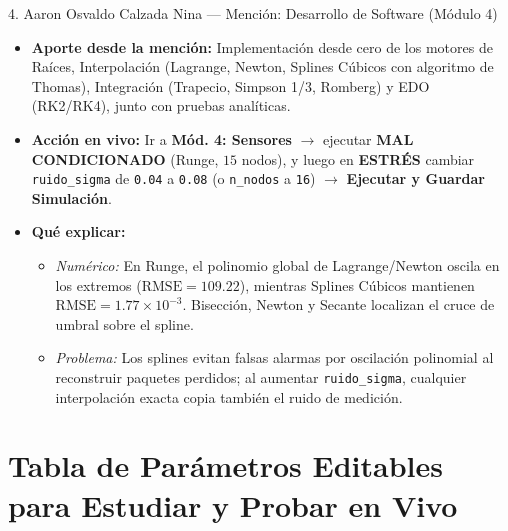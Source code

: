 \documentclass[11pt,a4paper]{article}
\begin{document}
\begin{ficha}{4. Aaron Osvaldo Calzada Nina — Mención: Desarrollo de Software (Módulo 4)}
\begin{itemize}[noitemsep]
    \item \textbf{Aporte desde la mención:} Implementación desde cero de los motores de Raíces, Interpolación (Lagrange, Newton, Splines Cúbicos con algoritmo de Thomas), Integración (Trapecio, Simpson 1/3, Romberg) y EDO (RK2/RK4), junto con pruebas analíticas.
    \item \textbf{Acción en vivo:} Ir a \textbf{Mód. 4: Sensores} $\rightarrow$ ejecutar \textbf{MAL CONDICIONADO} (Runge, $15$ nodos), y luego en \textbf{ESTRÉS} cambiar \texttt{ruido\_sigma} de \texttt{0.04} a \texttt{0.08} (o \texttt{n\_nodos} a \texttt{16}) $\rightarrow$ \textbf{Ejecutar y Guardar Simulación}.
    \item \textbf{Qué explicar:}
    \begin{itemize}[noitemsep]
        \item \textit{Numérico:} En Runge, el polinomio global de Lagrange/Newton oscila en los extremos ($\text{RMSE}=109.22$), mientras Splines Cúbicos mantienen $\text{RMSE}=1.77\times 10^{-3}$. Bisección, Newton y Secante localizan el cruce de umbral sobre el spline.
        \item \textit{Problema:} Los splines evitan falsas alarmas por oscilación polinomial al reconstruir paquetes perdidos; al aumentar \texttt{ruido\_sigma}, cualquier interpolación exacta copia también el ruido de medición.
    \end{itemize}
\end{itemize}
\end{ficha}

\section{Tabla de Parámetros Editables para Estudiar y Probar en Vivo}
\end{document}
